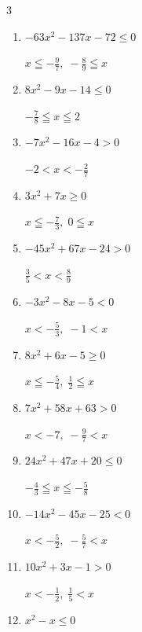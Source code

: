 \begin{multicols}{3}
\begin{enumerate}
        $\displaystyle -4 \leqq x \leqq -\frac{2}{7}$

\columnbreak %

  \item $-63x^{2}-137x-72\leq 0$

        $\displaystyle x \leqq -\frac{9}{7} , \; -\frac{8}{9} \leqq x$

  \item $8x^{2}-9x-14\leq 0$

        $\displaystyle -\frac{7}{8} \leqq x \leqq 2$

  \item $-7x^{2}-16x-4>0$

        $\displaystyle -2 < x < -\frac{2}{7}$

  \item $3x^{2}+7x\geq 0$

        $\displaystyle x \leqq -\frac{7}{3} , \; 0 \leqq x$

  \item $-45x^{2}+67x-24>0$

        $\displaystyle \frac{3}{5} < x < \frac{8}{9}$

  \item $-3x^{2}-8x-5<0$

        $\displaystyle x < -\frac{5}{3} , \; -1 < x$

  \item $8x^{2}+6x-5\geq 0$

        $\displaystyle x \leqq -\frac{5}{4} , \; \frac{1}{2} \leqq x$

  \item $7x^{2}+58x+63>0$

        $\displaystyle x < -7 , \; -\frac{9}{7} < x$

  \item $24x^{2}+47x+20\leq 0$

        $\displaystyle -\frac{4}{3} \leqq x \leqq -\frac{5}{8}$

  \item $-14x^{2}-45x-25<0$

        $\displaystyle x < -\frac{5}{2} , \; -\frac{5}{7} < x$

\columnbreak %

\resetques

  \item $10x^{2}+3x-1>0$

        $\displaystyle x < -\frac{1}{2} , \; \frac{1}{5} < x$

  \item $x^{2}-x\leq 0$


\end{enumerate}
\end{multicols}

